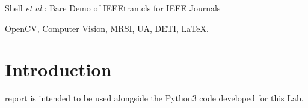 \documentclass[journal]{IEEEtran}
\begin{document}
%
{Shell \MakeLowercase{\textit{et al.}}: Bare Demo of IEEEtran.cls for IEEE Journals}
% 











\maketitle


\begin{IEEEkeywords}
OpenCV, Computer Vision, MRSI, UA, DETI, \LaTeX.
\end{IEEEkeywords}






%
\IEEEpeerreviewmaketitle



\section{Introduction}
\label{sec:intro}
% 
% 
% 
% 
 report is intended to be used alongside the Python3 code 
developed for this Lab. 
\end{document}
